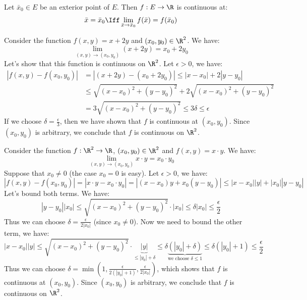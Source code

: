 \begin{definition}
    Let $\bar{x}_0 \in E$ be an exterior point of $E$. Then $f: E \to \R$ is continuous at:
    \[
        \bar{x} = \bar{x}_0 \Iff \lim_{\bar{x} \to \bar{x}_0} f(\bar{x}) = f(\bar{x}_0)
    \]
\end{definition}

\begin{eg}
    Consider the function $f(x,y) = x + 2y$ and $(x_0, y_0) \in \R^2$. We have:
    \[
        \lim_{(x,y) \to (x_0, y_0)} (x + 2y) = x_0 + 2y_0
    \]
    Let's show that this function is continuous on $\R^2$. Let $\epsilon > 0$, we have:
    \begin{align*}
        |f(x,y) - f(x_0, y_0)| &= |(x + 2y) - (x_0 + 2y_0)| \leq |x - x_0| + 2|y - y_0| \\
        & \leq \sqrt{(x - x_0)^2 + (y - y_0)^2} + 2\sqrt{(x - x_0)^2 + (y - y_0)^2} \\
        &= 3\sqrt{(x - x_0)^2 + (y - y_0)^2} \leq 3 \delta \leq \epsilon
    \end{align*}
    If we choose $\delta = \frac{\epsilon}{3}$, then we have shown that $f$ is continuous at $(x_0, y_0)$. Since $(x_0, y_0)$ is arbitrary, we conclude that $f$ is continuous on $\R^2$.
\end{eg}

\begin{eg}
    Consider the function $f: \R^2 \to \R$, $(x_0, y_0) \in \R^2$ and $f(x,y) = x \cdot y$. We have: 
    \[
        \lim_{(x,y) \to (x_0, y_0)} x \cdot y = x_0 \cdot y_0
    \]
    Suppose that $x_0 \neq 0$ (the case $x_0 = 0$ is easy). Let $\epsilon > 0$, we have:
    \[
        |f(x,y) - f(x_0, y_0)| = |x \cdot y - x_0 \cdot y_0| = |(x - x_0)y + x_0(y-y_0)| \leq |x - x_0||y| + |x_0||y-y_0|
    \]
    Let's bound both terms. We have:
    \[
        |y-y_0| |x_0| \leq \sqrt{(x-x_0)^2 + (y-y_0)^2} \cdot |x_0| \leq \delta |x_0| \leq \frac{\epsilon}{2}
    \]
    Thus we can choose $\delta = \frac{\epsilon}{2 |x_0|}$ (since $x_0 \neq 0$). Now we need to bound the other term, we have:
    \[
        |x - x_0| |y| \leq \sqrt{(x-x_0)^2 + (y-y_0)^2} \cdot \underbrace{|y|}_{\leq |y_0| + \delta} \leq \delta \underbrace{(|y_0| + \delta)}_{\text{we choose } \delta \leq 1} \leq \delta (|y_0| + 1) \leq \frac{\epsilon}{2}
    \]
    Thus we can choose $\delta = \min\left(1, \frac{\epsilon}{2(|y_0| + 1)}, \frac{\epsilon}{2 |x_0|}\right)$, which shows that $f$ is continuous at $(x_0, y_0)$. Since $(x_0, y_0)$ is arbitrary, we conclude that $f$ is continuous on $\R^2$.
\end{eg}

